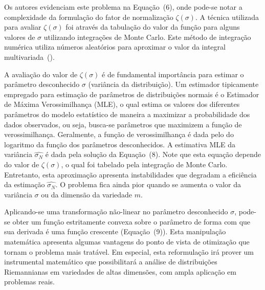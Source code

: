 \documentclass[a4paper,titlepage]{article}
\begin{document}
Os autores evidenciam este problema na Equação~(6), onde pode-se notar
a complexidade da formulação do fator de normalização $\zeta(\sigma)$. A
técnica utilizada para avaliar $\zeta(\sigma)$ foi através da tabulação do
valor da função para alguns valores de $\sigma$ utilizando integrações de Monte
Carlo.  Este método de integração numérica utiliza números aleatórios para
aproximar o valor da integral multivariada~(\cite{caflisch1998monte}).

A avaliação do valor de $\zeta(\sigma)$ é de fundamental importância para
estimar o parâmetro desconhecido $\sigma$ (variância da distribuição).
 Um estimador tipicamente empregado para estimação de parâmetros
de distribuições normais é o Estimador de Máxima Verossimilhança (MLE), o qual
estima os valores dos diferentes parâmetros do modelo estatístico de maneira a
maximizar a probabilidade dos dados observados, ou seja, busca-se parâmetros
que maximizem a função de verossimilhança. Geralmente, a função de
verossimilhança é dada pelo do logaritmo da função dos parâmetros
desconhecidos. A estimativa MLE da variância $\hat{\sigma_N}$ é dada pela
solução da Equação~(8). Note que esta equação depende do valor de
$\zeta(\sigma)$, o qual foi tabelado pela integração de Monte Carlo.
Entretanto, esta aproximação apresenta instabilidades que degradam a eficiência
da estimação $\hat{\sigma_N}$. O problema fica ainda pior quando se aumenta o
valor da variância $\sigma$ ou da dimensão da variedade $m$.  

\begin{center}
  \vspace{1em}
  \vspace{1em}
\end{center}

Aplicando-se uma transformação não-linear no parâmetro desconhecido $\sigma$,
pode-se obter um função estritamente convexa sobre o parâmetro de forma com que
sua derivada é uma função crescente (Equação~(9)). Esta manipulação matemática
apresenta algumas vantagens do ponto de vista de otimização que tornam o
problema mais tratável. Em especial, esta reformulação irá prover um
instrumental matemático que possibilitará a análise de distribuições
Riemannianas em variedades de altas dimensões, com ampla aplicação em problemas
reais.
\end{document}
